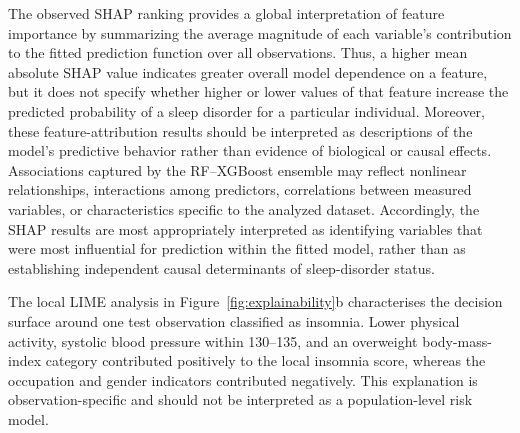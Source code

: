 \documentclass{elektr}
\begin{document}
The observed SHAP ranking provides a global interpretation of feature importance
by summarizing the average magnitude of each variable's contribution to the
fitted prediction function over all observations. Thus, a higher mean absolute
SHAP value indicates greater overall model dependence on a feature, but it does
not specify whether higher or lower values of that feature increase the predicted
probability of a sleep disorder for a particular individual. Moreover, these
feature-attribution results should be interpreted as descriptions of the model's
predictive behavior rather than evidence of biological or causal effects.
Associations captured by the RF--XGBoost ensemble may reflect nonlinear
relationships, interactions among predictors, correlations between measured
variables, or characteristics specific to the analyzed dataset. Accordingly,
the SHAP results are most appropriately interpreted as identifying variables
that were most influential for prediction within the fitted model, rather than
as establishing independent causal determinants of sleep-disorder status.

The local LIME analysis in Figure~\ref{fig:explainability}b characterises the decision surface around one test observation classified as insomnia. Lower physical activity, systolic blood pressure within 130--135, and an overweight body-mass-index category contributed positively to the local insomnia score, whereas the occupation and gender indicators contributed negatively. This explanation is observation-specific and should not be interpreted as a population-level risk model.
\end{document}

